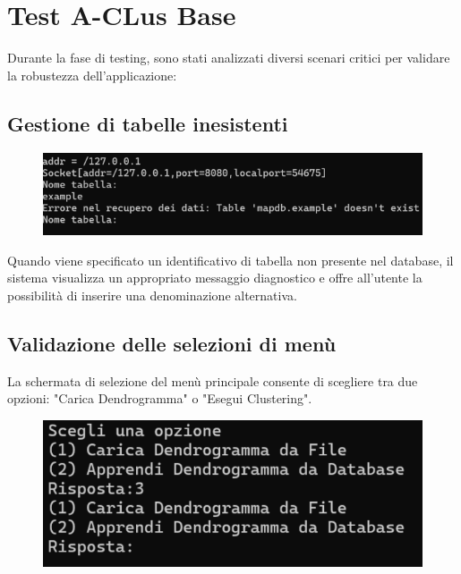 \section{Test A-CLus Base}

Durante la fase di testing, sono stati analizzati diversi scenari critici per validare la robustezza dell'applicazione:

\subsection{Gestione di tabelle inesistenti}

\begin{figure}[h!]
    \centering
    \includegraphics[width=\textwidth]{images/errore_tabella.png}
\end{figure}

Quando viene specificato un identificativo di tabella non presente nel database, il sistema visualizza un appropriato messaggio diagnostico e offre all'utente la possibilità di inserire una denominazione alternativa.


\subsection{Validazione delle selezioni di menù}

La schermata di selezione del menù principale consente di scegliere tra due opzioni: "Carica Dendrogramma" o "Esegui Clustering".

\begin{figure}[h!]
    \centering
    \includegraphics[width=\textwidth]{images/errore_men.png}
\end{figure}

